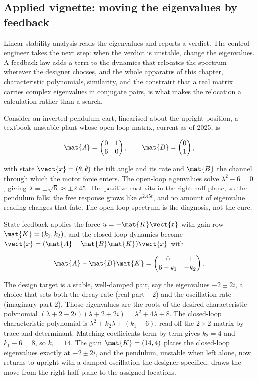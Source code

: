 \subsection{Applied vignette: moving the eigenvalues by feedback}

Linear-stability analysis reads the eigenvalues and reports a verdict.
The control engineer takes the next step: when the verdict is unstable,
change the eigenvalues. A feedback law adds a term to the dynamics that
relocates the spectrum wherever the designer chooses, and the whole
apparatus of this chapter, characteristic polynomials, similarity, and
the constraint that a real matrix carries complex eigenvalues in
conjugate pairs, is what makes the relocation a calculation rather than
a search.

Consider an inverted-pendulum cart, linearised about the upright
position, a textbook unstable plant whose open-loop matrix, current as
of 2025, is

\[
\mat{A} = \begin{pmatrix} 0 & 1 \\ 6 & 0 \end{pmatrix}, \qquad
\mat{B} = \begin{pmatrix} 0 \\ 1 \end{pmatrix},
\]

with state $\vect{x} = (\theta, \dot{\theta})$ the tilt angle and its
rate and $\mat{B}$ the channel through which the motor force enters. The
open-loop eigenvalues solve $\lambda^{2} - 6 = 0$, giving $\lambda =
\pm\sqrt{6} \approx \pm 2.45$. The positive root sits in the right
half-plane, so the pendulum falls: the free response grows like
$e^{2.45t}$, and no amount of eigenvalue reading changes that fate. The
open-loop spectrum is the diagnosis, not the cure.

State feedback applies the force $u = -\mat{K}\vect{x}$ with gain row
$\mat{K} = (k_{1}, k_{2})$, and the closed-loop dynamics become
$\dot{\vect{x}} = (\mat{A} - \mat{B}\mat{K})\vect{x}$ with

\[
\mat{A} - \mat{B}\mat{K} = \begin{pmatrix} 0 & 1 \\ 6 - k_{1} & -k_{2}
\end{pmatrix}.
\]

The design target is a stable, well-damped pair, say the eigenvalues
$-2 \pm 2i$, a choice that sets both the decay rate (real part $-2$) and
the oscillation rate (imaginary part $2$). Those eigenvalues are the
roots of the desired characteristic polynomial $(\lambda + 2 - 2i)
(\lambda + 2 + 2i) = \lambda^{2} + 4\lambda + 8$. The closed-loop
characteristic polynomial is $\lambda^{2} + k_{2}\lambda + (k_{1} - 6)$,
read off the $2 \times 2$ matrix by trace and determinant. Matching
coefficients term by term gives $k_{2} = 4$ and $k_{1} - 6 = 8$, so
$k_{1} = 14$. The gain $\mat{K} = (14, 4)$ places the closed-loop
eigenvalues exactly at $-2 \pm 2i$, and the pendulum, unstable when
left alone, now returns to upright with a damped oscillation the
designer specified.  draws the move
from the right half-plane to the assigned locations.

